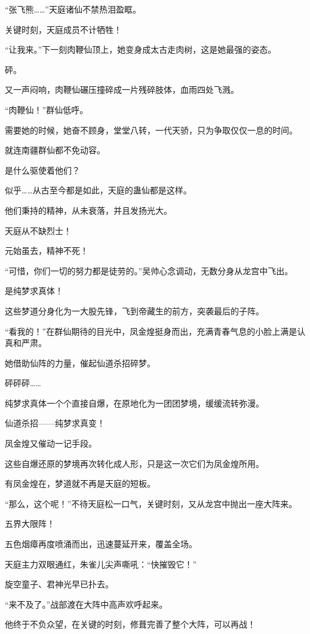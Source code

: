 \begin{this_body}
“张飞熊……”天庭诸仙不禁热泪盈眶。

关键时刻，天庭成员不计牺牲！

“让我来。”下一刻肉鞭仙顶上，她变身成太古走肉树，这是她最强的姿态。

砰。

又一声闷响，肉鞭仙碾压撞碎成一片残碎肢体，血雨四处飞溅。

“肉鞭仙！”群仙低呼。

需要她的时候，她奋不顾身，堂堂八转，一代天骄，只为争取仅仅一息的时间。

就连南疆群仙都不免动容。

是什么驱使着他们？

似乎……从古至今都是如此，天庭的蛊仙都是这样。

他们秉持的精神，从未衰落，并且发扬光大。

天庭从不缺烈士！

元始虽去，精神不死！

“可惜，你们一切的努力都是徒劳的。”吴帅心念调动，无数分身从龙宫中飞出。

是纯梦求真体！

这些梦道分身化为一大股先锋，飞到帝藏生的前方，突袭最后的子阵。

“看我的！”在群仙期待的目光中，凤金煌挺身而出，充满青春气息的小脸上满是认真和严肃。

她借助仙阵的力量，催起仙道杀招碎梦。

砰砰砰……

纯梦求真体一个个直接自爆，在原地化为一团团梦境，缓缓流转弥漫。

仙道杀招——纯梦求真变！

凤金煌又催动一记手段。

这些自爆还原的梦境再次转化成人形，只是这一次它们为凤金煌所用。

有凤金煌在，梦道就不再是天庭的短板。

“那么，这个呢！”不待天庭松一口气，关键时刻，又从龙宫中抛出一座大阵来。

五界大限阵！

五色烟瘴再度喷涌而出，迅速蔓延开来，覆盖全场。

天庭主力双眼通红，朱雀儿尖声嘶吼：“快摧毁它！”

旋空童子、君神光早已扑去。

“来不及了。”战部渡在大阵中高声欢呼起来。

他终于不负众望，在关键的时刻，修葺完善了整个大阵，可以再战！


\end{this_body}
